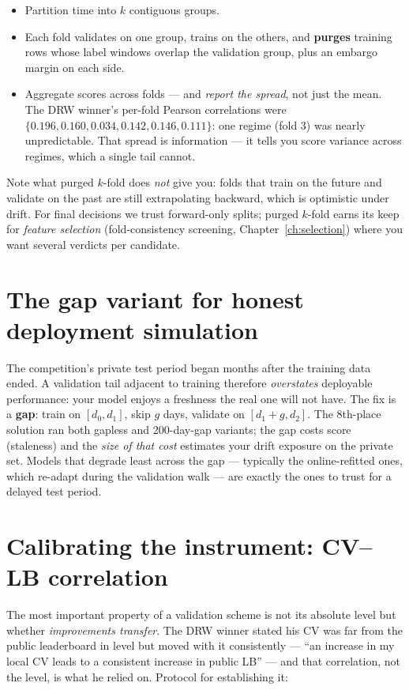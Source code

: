 \begin{itemize}
\item Partition time into $k$ contiguous groups.
\item Each fold validates on one group, trains on the others, and
  \textbf{purges} training rows whose label windows overlap the validation
  group, plus an embargo margin on each side.
\item Aggregate scores across folds --- and \emph{report the spread}, not
  just the mean. The DRW winner's per-fold Pearson correlations were
  $\{0.196, 0.160, 0.034, 0.142, 0.146, 0.111\}$: one regime (fold 3) was
  nearly unpredictable. That spread is information --- it tells you score
  variance across regimes, which a single tail cannot.
\end{itemize}

Note what purged $k$-fold does \emph{not} give you: folds that train on the
future and validate on the past are still extrapolating backward, which is
optimistic under drift. For final decisions we trust forward-only splits;
purged $k$-fold earns its keep for \emph{feature selection} (fold-consistency
screening, Chapter~\ref{ch:selection}) where you want several verdicts
per candidate.

\section{The gap variant for honest deployment simulation}

The competition's private test period began months after the training data
ended. A validation tail adjacent to training therefore \emph{overstates}
deployable performance: your model enjoys a freshness the real one will not
have. The fix is a \textbf{gap}: train on $[d_0, d_1]$, skip $g$ days,
validate on $[d_1{+}g, d_2]$. The 8th-place solution ran both gapless and
200-day-gap variants; the gap costs score (staleness) and the \emph{size of
that cost} estimates your drift exposure on the private set. Models that
degrade least across the gap --- typically the online-refitted ones, which
re-adapt during the validation walk --- are exactly the ones to trust for a
delayed test period.

\section{Calibrating the instrument: CV--LB correlation}

The most important property of a validation scheme is not its absolute
level but whether \emph{improvements transfer}. The DRW winner stated his
CV was far from the public leaderboard in level but moved with it
consistently --- ``an increase in my local CV leads to a consistent increase
in public LB'' --- and that correlation, not the level, is what he relied
on. Protocol for establishing it:

